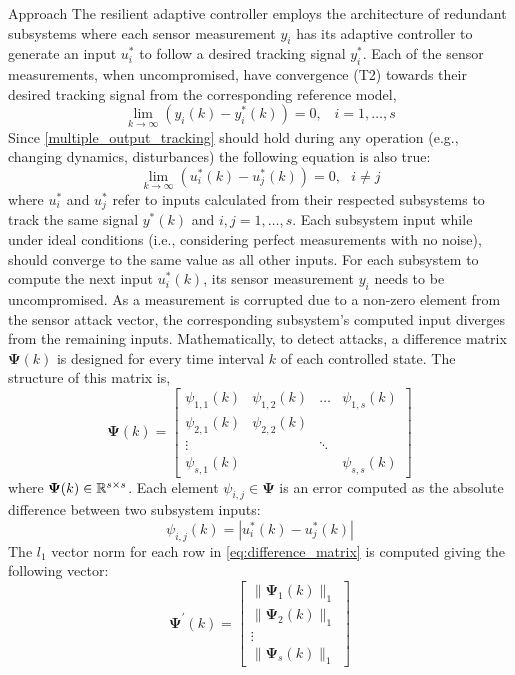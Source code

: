 \begin{section}{Approach}
The resilient adaptive controller employs the architecture of redundant subsystems where each sensor measurement $y_i$ has its adaptive controller to generate an input $u^*_i$ to follow a desired tracking signal $y^*_i$. Each of the sensor measurements, when uncompromised, have convergence (T2) towards their desired tracking signal from the corresponding reference model,
    \begin{equation}
    \label{multiple_output_tracking}
    \lim_{k\to\infty}(y_i(k)-y^*_i(k))=0, \;\;\; i=1,\dots,s
    \end{equation}
Since \eqref{multiple_output_tracking} should hold during any operation (e.g., changing dynamics, disturbances) the following equation is also true:
\begin{equation}
    \label{eq:u_to_0}
    \lim_{k\to\infty}(u^*_i(k)-u^*_j(k))=0, \text{ }i\neq j
\end{equation}
where $u^*_i$ and $u^*_j$ refer to inputs calculated from their respected subsystems to track the same signal $y^*(k)$ and $i,j = 1,\dots,s$. Each subsystem input while under ideal conditions (i.e., considering perfect measurements with no noise), should converge to the same value as all other inputs. For each subsystem to compute the next input $u^*_i(k)$, its sensor measurement $y_i$ needs to be uncompromised. As a measurement is corrupted due to a non-zero element from the sensor attack vector, the corresponding subsystem's computed input diverges from the remaining inputs. Mathematically, to detect attacks, a difference matrix $\bm{\Psi}(k)$ is designed for every time interval $k$ of each controlled state. The structure of this matrix is,
    \begin{equation}
    \label{eq:difference_matrix}
	\bm{\Psi}(k)=\begin{bmatrix} \psi_{1,1}(k) & \psi_{1,2}(k) & \dots & \psi_{1,s}(k) \\ \psi_{2,1}(k) & \psi_{2,2}(k) &  &  \\ \vdots &  & \ddots &  \\ \psi_{s,1}(k) &  &  & \psi_{s,s}(k) \end{bmatrix}
	\end{equation}
where $\bm{\Psi}(k) \in \mathbb{R}^{s\times s}$. Each element $\psi_{i,j}\in\bm{\Psi}$ is an error computed as the absolute difference between two subsystem inputs:
    \begin{equation}
        \label{eq:input_diff}
        \psi_{i,j}(k)=|u^*_i(k)-u^*_j(k)|
    \end{equation}
The $l_1$ vector norm for each row in \eqref{eq:difference_matrix} is computed giving the following vector:
    \begin{equation}
    \label{eq:difference_vector}
	\bm{\Psi^{'}}(k)=\begin{bmatrix} \lVert{\bm{\Psi}_1(k)}\rVert_1 \\ \lVert{\bm{\Psi}_2(k)}\rVert_1 \\ \vdots \\ \lVert{\bm{\Psi}_s(k)}\rVert_1 \end{bmatrix}
	\end{equation}


\end{section}

